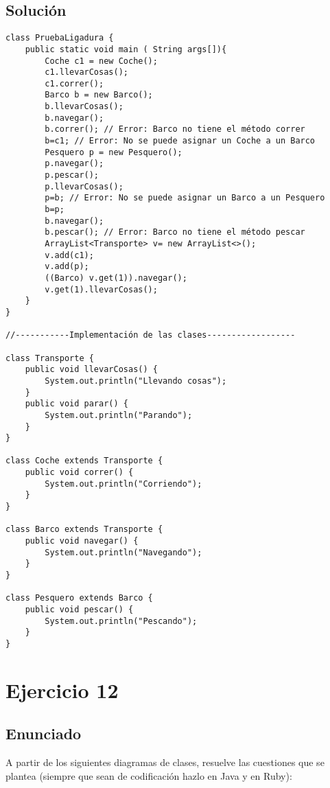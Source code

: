 \documentclass[a4paper,12pt]{article}
\begin{document}
\subsection{Solución}

\begin{lstlisting}[style=customjava, caption={Ejercicio del Enunciado}]
class PruebaLigadura {
    public static void main ( String args[]){
        Coche c1 = new Coche();
        c1.llevarCosas();
        c1.correr();
        Barco b = new Barco();
        b.llevarCosas();
        b.navegar();
        b.correr(); // Error: Barco no tiene el método correr
        b=c1; // Error: No se puede asignar un Coche a un Barco
        Pesquero p = new Pesquero();
        p.navegar();
        p.pescar();
        p.llevarCosas();
        p=b; // Error: No se puede asignar un Barco a un Pesquero
        b=p;
        b.navegar();    
        b.pescar(); // Error: Barco no tiene el método pescar
        ArrayList<Transporte> v= new ArrayList<>();
        v.add(c1);
        v.add(p);
        ((Barco) v.get(1)).navegar();
        v.get(1).llevarCosas();
    }
}

//-----------Implementación de las clases------------------

class Transporte {
    public void llevarCosas() {
        System.out.println("Llevando cosas");
    }
    public void parar() {
        System.out.println("Parando");
    }
}

class Coche extends Transporte {
    public void correr() {
        System.out.println("Corriendo");
    }
}

class Barco extends Transporte {
    public void navegar() {
        System.out.println("Navegando");
    }
}

class Pesquero extends Barco {
    public void pescar() {
        System.out.println("Pescando");
    }
}
\end{lstlisting}

\section{Ejercicio 12}

\subsection{Enunciado}

A partir de los siguientes diagramas de clases, resuelve las cuestiones que se plantea
(siempre que sean de codificación hazlo en Java y en Ruby):
\end{document}
